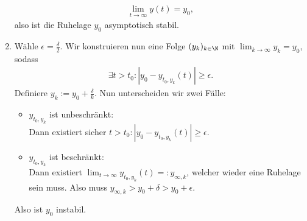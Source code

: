 \begin{solution}
\begin{enumerate}[label = \textbf{\alph*)}]
\begin{align*}
  \lim_{t \to \infty} y(t) = y_0,
\end{align*}
also ist die Ruhelage $y_0$ asymptotisch stabil.
\item Wähle $\epsilon = \frac{\delta}{2}$. Wir konstruieren nun eine Folge
$(y_k)_{k \in \N}$ mit $\lim_{k \rightarrow \infty} y_k = y_0$, sodass
\begin{align*}
  \exists t > t_0: |y_0 - y_{t_0,y_k}(t) | \geq \epsilon.
\end{align*}
Definiere $y_k := y_0 + \frac{\delta}{k}$.
Nun unterscheiden wir zwei Fälle:
\begin{itemize}
  \item $y_{t_0,y_k}$ ist unbeschränkt: \\
  Dann existiert sicher $t > t_0: |y_0 - y_{t_0,y_k}(t) | \geq \epsilon.$
  \item $y_{t_0,y_k}$ ist beschränkt: \\
  Dann existiert $\lim_{t \rightarrow \infty} y_{t_0,y_k}(t) =: y_{\infty,k}$, welcher wieder
  eine Ruhelage sein muss. Also muss $y_{\infty,k} > y_0 + \delta > y_0 + \epsilon$.
\end{itemize}
Also ist $y_0$ instabil.
\end{enumerate}
\end{solution}
